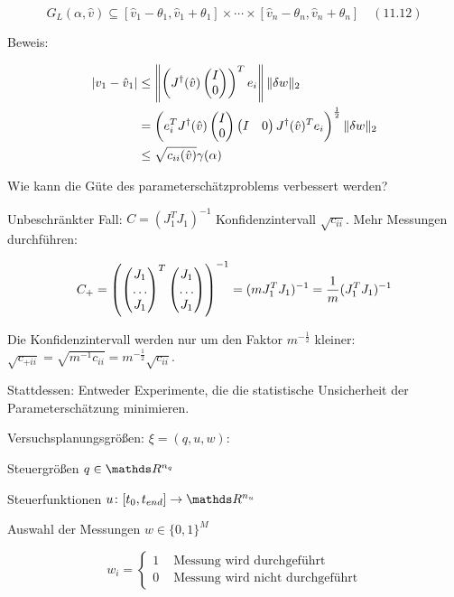 \[ G_L(\alpha,\hat v) \subseteq [ \hat v_1 - \theta_1, \hat v_1 + \theta_1] \times \cdots \times [\hat v_n - \theta_n, \hat v_n + \theta_n ] \quad (11.12)\]

Beweis:

\begin{align*}
|v_1-\hat v_1| &\leq \left\| \left( J^\dagger(\hat v) \begin{pmatrix} I \\ 0 \end{pmatrix} \right)^T e_i \right\| \|\delta w\|_2 \\
&= \left( e_i^TJ^\dagger(\hat v) \begin{pmatrix} I \\ 0 \end{pmatrix} \begin{pmatrix} I & 0 \end{pmatrix} J^\dagger (\hat v)^T e_i \right)^{\frac 12} \|\delta w\|_2 \\
&\leq \sqrt{c_{ii}(\hat v)} \gamma(\alpha) \\
\end{align*}


Wie kann die Güte des parameterschätzproblems verbessert werden?

Unbeschränkter Fall: $C = (J_1^T J_1)^{-1}$ Konfidenzintervall $\sqrt{c_{ii}}$. Mehr Messungen durchführen:

\begin{align*}
C_+ &= \left( \begin{pmatrix} J_1 \\ \hdots \\ J_1 \end{pmatrix}^T \begin{pmatrix} J_1 \\ \hdots \\ J_1 \end{pmatrix} \right)^{-1} = (m J_1^T J_1)^{-1} = \frac 1m (J_1^T J_1)^{-1} \\
\end{align*}

Die Konfidenzintervall werden nur um den Faktor $m^{-\frac 12}$ kleiner: $\sqrt{c_{+ii}} = \sqrt{m^{-1} c_{ii}} = m^{-\frac 12} \sqrt{c_{ii}}$.

Stattdessen: Entweder Experimente, die die statistische Unsicherheit der Parameterschätzung minimieren.

Versuchsplanungsgrößen: $\xi = (q,u,w)$:

\bitm
\item Steuergrößen $q \in \R^{n_q}$
\item Steuerfunktionen $u\colon [\tn, \tend] \to \R^{n_u}$
\item Auswahl der Messungen $w\in \{0,1\}^M$
\eitm

\[ w_i = \begin{cases} 1 & \text{ Messung wird durchgeführt} \\ 0 & \text{ Messung wird nicht durchgeführt} \end{cases} \]

